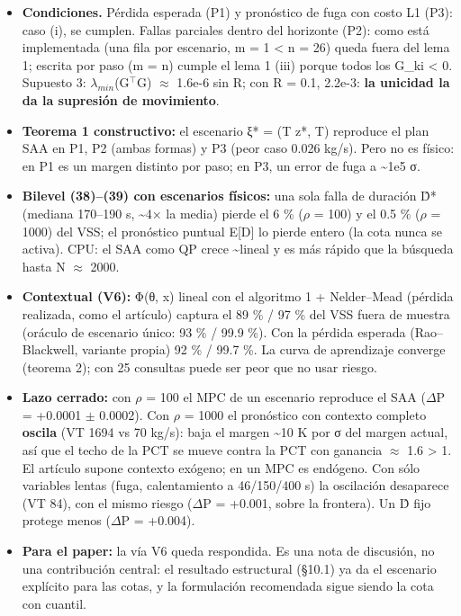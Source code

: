 \documentclass[11pt,a4paper]{article}
\begin{document}
\begin{itemize}
\item \textbf{Condiciones.} Pérdida esperada (P1) y pronóstico de fuga con costo L1 (P3): caso (i), se cumplen. Fallas parciales dentro del horizonte (P2): como está implementada (una fila por escenario, m = 1 < n = 26) queda fuera del lema 1; escrita por paso (m = n) cumple el lema 1 (iii) porque todos los G\_ki < 0. Supuesto 3: $\lambda _{min}$(G$^{\top }$G) $\approx$ 1.6e-6 sin R; con R = 0.1, 2.2e-3: \textbf{la unicidad la da la supresión de movimiento}.
\item \textbf{Teorema 1 constructivo:} el escenario ξ* = (T z*, T) reproduce el plan SAA en P1, P2 (ambas formas) y P3 (peor caso 0.026 kg/s). Pero no es físico: en P1 es un margen distinto por paso; en P3, un error de fuga a \textasciitilde{}1e5 σ.
\item \textbf{Bilevel (38)–(39) con escenarios físicos:} una sola falla de duración D̂* (mediana 170–190 s, \textasciitilde{}4$\times$ la media) pierde el 6 \% ($\rho$ = 100) y el 0.5 \% ($\rho$ = 1000) del VSS; el pronóstico puntual E[D] lo pierde entero (la cota nunca se activa). CPU: el SAA como QP crece \textasciitilde{}lineal y es más rápido que la búsqueda hasta N $\approx$ 2000.
\item \textbf{Contextual (V6):} Φ(θ, x) lineal con el algoritmo 1 + Nelder–Mead (pérdida realizada, como el artículo) captura el 89 \% / 97 \% del VSS fuera de muestra (oráculo de escenario único: 93 \% / 99.9 \%). Con la pérdida esperada (Rao–Blackwell, variante propia) 92 \% / 99.7 \%. La curva de aprendizaje converge (teorema 2); con 25 consultas puede ser peor que no usar riesgo.
\item \textbf{Lazo cerrado:} con $\rho$ = 100 el MPC de un escenario reproduce el SAA ($\Delta$P = +0.0001 $\pm$ 0.0002). Con $\rho$ = 1000 el pronóstico con contexto completo \textbf{oscila} (VT 1694 vs 70 kg/s): baja el margen \textasciitilde{}10 K por σ del margen actual, así que el techo de la PCT se mueve contra la PCT con ganancia $\approx$ 1.6 > 1. El artículo supone contexto exógeno; en un MPC es endógeno. Con sólo variables lentas (fuga, calentamiento a 46/150/400 s) la oscilación desaparece (VT 84), con el mismo riesgo ($\Delta$P = +0.001, sobre la frontera). Un D̂ fijo protege menos ($\Delta$P = +0.004).
\item \textbf{Para el paper:} la vía V6 queda respondida. Es una nota de discusión, no una contribución central: el resultado estructural (\S{}10.1) ya da el escenario explícito para las cotas, y la formulación recomendada sigue siendo la cota con cuantil.

\end{itemize}
\end{document}
